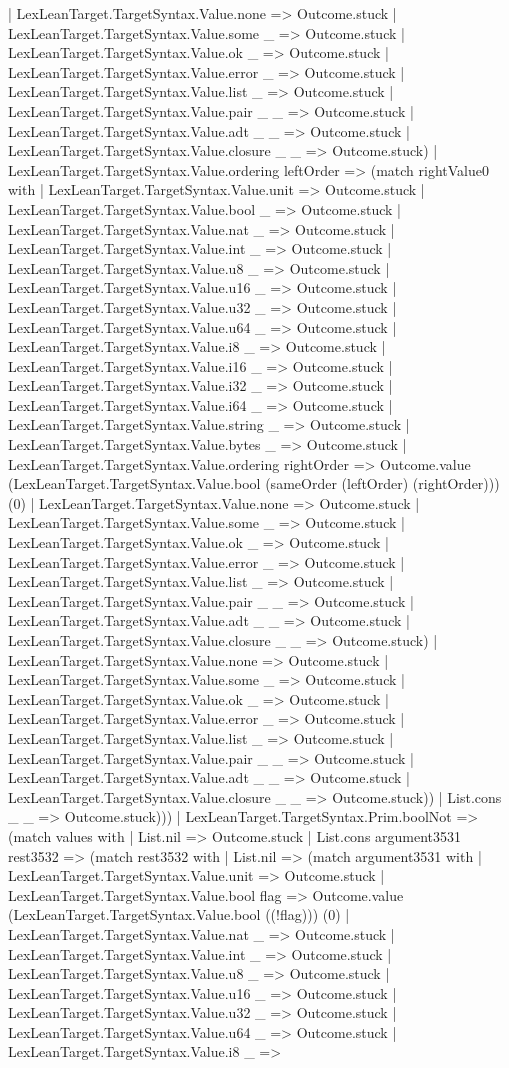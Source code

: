 \documentclass[11pt]{article}
\begin{document}
| LexLeanTarget.TargetSyntax.Value.none => Outcome.stuck | LexLeanTarget.TargetSyntax.Value.some \_ => Outcome.stuck | LexLeanTarget.TargetSyntax.Value.ok \_ => Outcome.stuck | LexLeanTarget.TargetSyntax.Value.error \_ => Outcome.stuck | LexLeanTarget.TargetSyntax.Value.list \_ => Outcome.stuck | LexLeanTarget.TargetSyntax.Value.pair \_ \_ => Outcome.stuck | LexLeanTarget.TargetSyntax.Value.adt \_ \_ => Outcome.stuck | LexLeanTarget.TargetSyntax.Value.closure \_ \_ => Outcome.stuck) | LexLeanTarget.TargetSyntax.Value.ordering leftOrder => (match rightValue0 with | LexLeanTarget.TargetSyntax.Value.unit => Outcome.stuck | LexLeanTarget.TargetSyntax.Value.bool \_ => Outcome.stuck | LexLeanTarget.TargetSyntax.Value.nat \_ => Outcome.stuck | LexLeanTarget.TargetSyntax.Value.int \_ => Outcome.stuck | LexLeanTarget.TargetSyntax.Value.u8 \_ => Outcome.stuck | LexLeanTarget.TargetSyntax.Value.u16 \_ => Outcome.stuck | LexLeanTarget.TargetSyntax.Value.u32 \_ => Outcome.stuck | LexLeanTarget.TargetSyntax.Value.u64 \_ => Outcome.stuck | LexLeanTarget.TargetSyntax.Value.i8 \_ => Outcome.stuck | LexLeanTarget.TargetSyntax.Value.i16 \_ => Outcome.stuck | LexLeanTarget.TargetSyntax.Value.i32 \_ => Outcome.stuck | LexLeanTarget.TargetSyntax.Value.i64 \_ => Outcome.stuck | LexLeanTarget.TargetSyntax.Value.string \_ => Outcome.stuck | LexLeanTarget.TargetSyntax.Value.bytes \_ => Outcome.stuck | LexLeanTarget.TargetSyntax.Value.ordering rightOrder => Outcome.value (LexLeanTarget.TargetSyntax.Value.bool (sameOrder (leftOrder) (rightOrder))) (0) | LexLeanTarget.TargetSyntax.Value.none => Outcome.stuck | LexLeanTarget.TargetSyntax.Value.some \_ => Outcome.stuck | LexLeanTarget.TargetSyntax.Value.ok \_ => Outcome.stuck | LexLeanTarget.TargetSyntax.Value.error \_ => Outcome.stuck | LexLeanTarget.TargetSyntax.Value.list \_ => Outcome.stuck | LexLeanTarget.TargetSyntax.Value.pair \_ \_ => Outcome.stuck | LexLeanTarget.TargetSyntax.Value.adt \_ \_ => Outcome.stuck | LexLeanTarget.TargetSyntax.Value.closure \_ \_ => Outcome.stuck) | LexLeanTarget.TargetSyntax.Value.none => Outcome.stuck | LexLeanTarget.TargetSyntax.Value.some \_ => Outcome.stuck | LexLeanTarget.TargetSyntax.Value.ok \_ => Outcome.stuck | LexLeanTarget.TargetSyntax.Value.error \_ => Outcome.stuck | LexLeanTarget.TargetSyntax.Value.list \_ => Outcome.stuck | LexLeanTarget.TargetSyntax.Value.pair \_ \_ => Outcome.stuck | LexLeanTarget.TargetSyntax.Value.adt \_ \_ => Outcome.stuck | LexLeanTarget.TargetSyntax.Value.closure \_ \_ => Outcome.stuck)) | List.cons \_ \_ => Outcome.stuck))) | LexLeanTarget.TargetSyntax.Prim.boolNot => (match values with | List.nil => Outcome.stuck | List.cons argument3531 rest3532 => (match rest3532 with | List.nil => (match argument3531 with | LexLeanTarget.TargetSyntax.Value.unit => Outcome.stuck | LexLeanTarget.TargetSyntax.Value.bool flag => Outcome.value (LexLeanTarget.TargetSyntax.Value.bool ((!flag))) (0) | LexLeanTarget.TargetSyntax.Value.nat \_ => Outcome.stuck | LexLeanTarget.TargetSyntax.Value.int \_ => Outcome.stuck | LexLeanTarget.TargetSyntax.Value.u8 \_ => Outcome.stuck | LexLeanTarget.TargetSyntax.Value.u16 \_ => Outcome.stuck | LexLeanTarget.TargetSyntax.Value.u32 \_ => Outcome.stuck | LexLeanTarget.TargetSyntax.Value.u64 \_ => Outcome.stuck | LexLeanTarget.TargetSyntax.Value.i8 \_ => 
\end{document}
